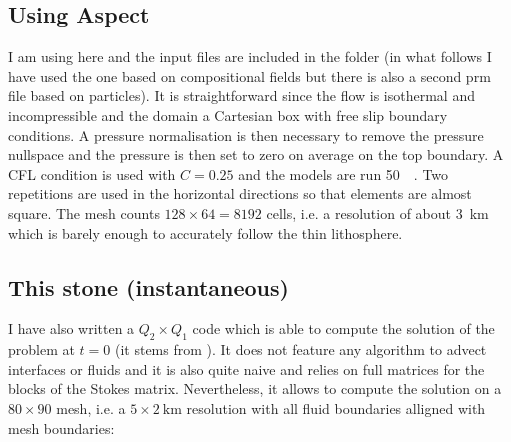 \subsection*{Using Aspect}

I am using here \aspect and the input files are included in the folder (in 
what follows I have used the one based on compositional fields but there
is also a second prm file based on particles). It is straightforward 
since the flow is isothermal and incompressible and the domain a Cartesian box with 
free slip boundary conditions. A pressure normalisation is then necessary to remove 
the pressure nullspace and the pressure is then set to zero on average on the top boundary. 
A CFL condition is used with $C=0.25$ and the models 
are run 50~\si{\mega\year}. 
Two repetitions are used in the horizontal directions so that elements are almost square.
The mesh counts $128\times 64=8192$ cells, i.e. a resolution of about 3~\si{\km} which is barely enough to 
accurately follow the thin lithosphere.


\subsection*{This stone (instantaneous)}

I have also written a $Q_2\times Q_1$ code which is able to 
compute the solution of the problem at $t=0$ (it stems from ). 
It does not feature any algorithm to advect interfaces or fluids and
it is also quite naive and relies on full matrices for the 
blocks of the Stokes matrix. Nevertheless, it allows to compute the solution 
on a $80\times 90$ mesh, i.e. a $5\times 2~\si{\km}$ resolution with 
all fluid boundaries alligned with mesh boundaries:

